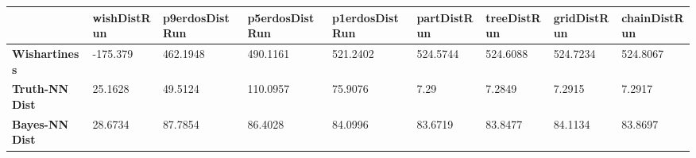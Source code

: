 \begin{tabular}{|l|l|l|l|l|l|l|l|l|}
\hline
&\textbf{wishDistRun}&\textbf{p9erdosDistRun}&\textbf{p5erdosDistRun}&\textbf{p1erdosDistRun}&\textbf{partDistRun}&\textbf{treeDistRun}&\textbf{gridDistRun}&\textbf{chainDistRun}\\\hline
\textbf{Wishartiness}&-175.379&462.1948&490.1161&521.2402&524.5744&524.6088&524.7234&524.8067\\\hline
\textbf{Truth-NN Dist}&25.1628&49.5124&110.0957&75.9076&7.29&7.2849&7.2915&7.2917\\\hline
\textbf{Bayes-NN Dist}&28.6734&87.7854&86.4028&84.0996&83.6719&83.8477&84.1134&83.8697\\\hline
\end{tabular}
